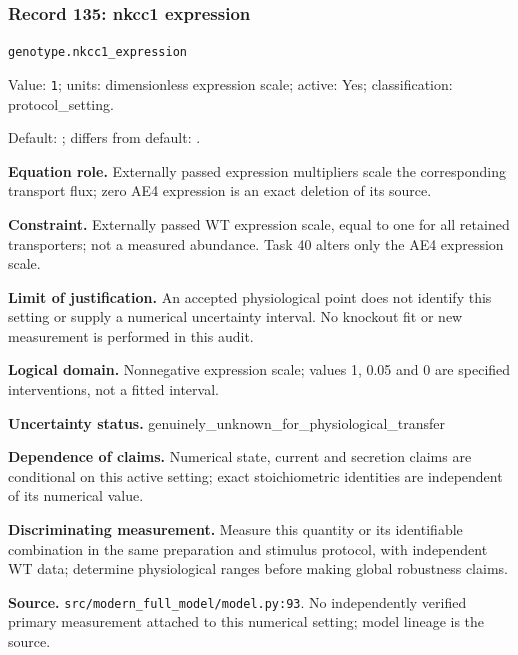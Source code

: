 \subsubsection*{Record 135: nkcc1 expression}
{\small \nolinkurl{genotype.nkcc1_expression}\par

Value: \texttt{1}; units: dimensionless expression scale; active: Yes; classification: protocol\_setting.\par

Default: ; differs from default: .\par

\textbf{Equation role.} Externally passed expression multipliers scale the corresponding transport flux; zero AE4 expression is an exact deletion of its source.\par

\textbf{Constraint.} Externally passed WT expression scale, equal to one for all retained transporters; not a measured abundance. Task 40 alters only the AE4 expression scale.\par

\textbf{Limit of justification.} An accepted physiological point does not identify this setting or supply a numerical uncertainty interval. No knockout fit or new measurement is performed in this audit.\par

\textbf{Logical domain.} Nonnegative expression scale; values 1, 0.05 and 0 are specified interventions, not a fitted interval.\par

\textbf{Uncertainty status.} genuinely\_unknown\_for\_physiological\_transfer\par

\textbf{Dependence of claims.} Numerical state, current and secretion claims are conditional on this active setting; exact stoichiometric identities are independent of its numerical value.\par

\textbf{Discriminating measurement.} Measure this quantity or its identifiable combination in the same preparation and stimulus protocol, with independent WT data; determine physiological ranges before making global robustness claims.\par

\textbf{Source.} \nolinkurl{src/modern_full_model/model.py:93}. No independently verified primary measurement attached to this numerical setting; model lineage is the source.\par}

